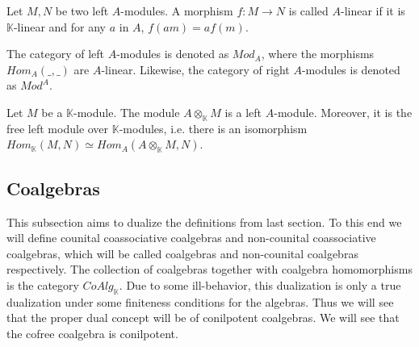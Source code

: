 \documentclass[../thesis.tex]{subfiles}
\begin{document}
\begin{definition}[Modules]
\begin{center}
                \end{center}
            \end{definition}

            \begin{definition}
                Let $M,N$ be two left $A$-modules. A morphism $f:M\rightarrow N$ is called $A$-linear if it is $\mathbb{K}$-linear and for any $a$ in $A$, $f(am) = af(m)$.
            \end{definition}

            The category of left $A$-modules is denoted as $Mod_A$, where the morphisms $Hom_A(\_,\_)$ are $A$-linear. Likewise, the category of right $A$-modules is denoted as $Mod^A$. 

            \begin{proposition}
                Let $M$ be a $\mathbb{K}$-module. The module $A\otimes_{\mathbb{K}}M$ is a left $A$-module. Moreover, it is the free left module over $\mathbb{K}$-modules, i.e. there is an isomorphism $Hom_{\mathbb{K}}(M,N)\simeq Hom_{A}(A\otimes_{\mathbb{K}}M,N)$.
            \end{proposition}
            
        \subsection{Coalgebras}
            This subsection aims to dualize the definitions from last section. To this end we will define counital coassociative coalgebras and non-counital coassociative coalgebras, which will be called coalgebras and non-counital coalgebras respectively. The collection of coalgebras together with coalgebra homomorphisms is the category $CoAlg_{\mathbb{K}}$. Due to some ill-behavior, this dualization is only a true dualization under some finiteness conditions for the algebras. Thus we will see that the proper dual concept will be of conilpotent coalgebras. We will see that the cofree coalgebra is conilpotent.
\end{document}
